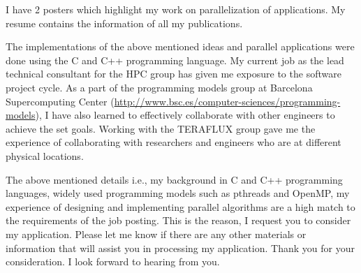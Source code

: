 \documentclass[10pt,stdletter,dateno]{newlfm}
\begin{document}
\begin{newlfm}
	   I have 2 posters which highlight my work on parallelization of applications.
	   My resume contains the information of all my publications.
%
	   \par
	   The implementations of the above mentioned ideas and parallel applications were done using the C and C++ programming language.
	   My current job as the lead technical consultant for the HPC group has given me exposure to the software project cycle.
	   As a part of the programming models group at Barcelona Supercomputing Center (\url{http://www.bsc.es/computer-sciences/programming-models}), I have also learned to effectively collaborate with other engineers to achieve the set goals.
	   Working with the TERAFLUX group gave me the experience of collaborating with researchers and engineers who are at different physical locations.
	   \par
	   The above mentioned details i.e., my background in C and C++ programming languages, widely used programming models such as pthreads and OpenMP, my experience of designing and implementing parallel algorithms are a high match to the requirements of the job posting.
	   This is the reason, I request you to consider my application.
	   Please let me know if there are any other materials or information that will assist you in processing my application.
	   Thank you for your consideration. I look forward to hearing from you.
%
\end{newlfm}
\end{document}
